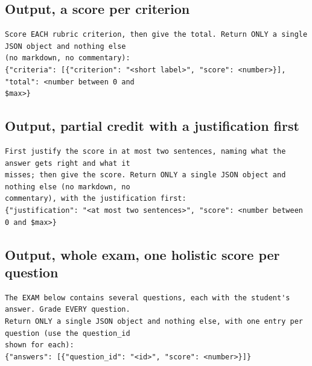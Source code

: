 \documentclass[10pt]{article}
\begin{document}
\subsection*{Output, a score per criterion}
\begin{Verbatim}[fontsize=\footnotesize]
Score EACH rubric criterion, then give the total. Return ONLY a single JSON object and nothing else
(no markdown, no commentary):
{"criteria": [{"criterion": "<short label>", "score": <number>}], "total": <number between 0 and
$max>}
\end{Verbatim}
\subsection*{Output, partial credit with a justification first}
\begin{Verbatim}[fontsize=\footnotesize]
First justify the score in at most two sentences, naming what the answer gets right and what it
misses; then give the score. Return ONLY a single JSON object and nothing else (no markdown, no
commentary), with the justification first:
{"justification": "<at most two sentences>", "score": <number between 0 and $max>}
\end{Verbatim}
\subsection*{Output, whole exam, one holistic score per question}
\begin{Verbatim}[fontsize=\footnotesize]
The EXAM below contains several questions, each with the student's answer. Grade EVERY question.
Return ONLY a single JSON object and nothing else, with one entry per question (use the question_id
shown for each):
{"answers": [{"question_id": "<id>", "score": <number>}]}
\end{Verbatim}
\end{document}
